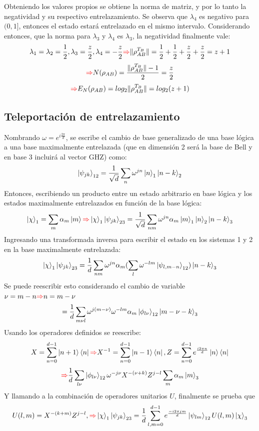 \documentclass{book}
\begin{document}
Obteniendo los valores propios se obtiene la norma de matriz, y por lo tanto la negatividad y su respectivo entrelazamiento. Se observa que $\lambda_4$ es negativo para $(0,1]$, entonces el estado estará entrelazado en el mismo intervalo. Considerando entonces, que la norma para $\lambda_3$ y $\lambda_4$ es $\lambda_3$, la negatividad finalmente vale:
$$\lambda_1=\lambda_2=\frac{1}{2},\lambda_3=\frac{z}{2},\lambda_4=-\frac{z}{2}\textcolor{red}{\Rightarrow} \lVert\rho_{AB}^{T_B}\rVert=\frac{1}{2}+\frac{1}{2}+\frac{z}{2}+\frac{z}{2}=z+1$$
$$\textcolor{red}{\Rightarrow} N(\rho_{AB})=\frac{\lVert\rho_{AB}^{T_B}\rVert-1}{2}=\frac{z}{2}$$ 
$$\textcolor{red}{\Rightarrow} E_N(\rho_{AB})=log_2\lVert\rho_{AB}^{T_B}\rVert=log_2(z+1)$$
\subsection{Teleportación de entrelazamiento} Nombrando $\omega=e^{i\frac{2\pi}{d}}$, se escribe el cambio de base generalizado de una base lógica a una base maximalmente entrelazada (que en dimensión 2 será la base de Bell y en base 3 incluirá al vector GHZ) como:
$$\ket{\psi_{jk}}_{12}=\frac{1}{\sqrt{d}}\sum_n \omega^{jn}\ket{n}_1\ket{n-k}_2$$
Entonces, escribiendo un producto entre un estado arbitrario en base lógica y los estados maximalmente entrelazados en función de la base lógica:
$$\ket{\chi}_1=\sum_m\alpha_m\ket{m}\textcolor{red}{\Rightarrow} \ket{\chi}_1\ket{\psi_{jk}}_{23}=\frac{1}{\sqrt{d}}\sum_{nm} \omega^{jn}\alpha_m\ket{m}_1\ket{n}_2\ket{n-k}_3$$
Ingresando una transformada inversa para escribir el estado en los sistemas 1 y 2 en la base maximalmente entrelazada:
$$\ket{\chi}_1\ket{\psi_{jk}}_{23}=\frac{1}{d}\sum_{nm} \omega^{jn}\alpha_m(\sum_l \omega^{-lm}\ket{\psi_{l,m-n}}_{12})\ket{n-k}_3$$
Se puede reescribir esto considerando el cambio de variable $\nu=m-n\textcolor{red}{\Rightarrow} n=m-\nu$
$$=\frac{1}{d}\sum_{m\nu l}\omega^{j(m-\nu)}\omega^{-lm}\alpha_m\ket{\phi_{l\nu}}_{12}\ket{m-\nu-k}_3 $$
Usando los operadores definidos se reescribe:
$$X=\sum_{n=0}^{d-1}\ket{n+1}\bra{n} \textcolor{red}{\Rightarrow} X^{-1}=\sum_{n=0}^{d-1}\ket{n-1}\bra{n}, Z=\sum_{n=0}^{d-1}e^{\frac{i2\pi n}{d}}\ket{n}\bra{n}$$
$$ \textcolor{red}{\Rightarrow} \frac{1}{d}\sum_{l\nu}\ket{\phi_{l\nu}}_{12}\omega^{-j\nu}X^{-(\nu+k)}Z^{j-l}\sum_m\alpha_m\ket{m}_3$$
Y llamando a la combinación de operadores unitarios $U$, finalmente se prueba que
$$ U(l,m)=X^{-(k+m)}Z^{j-l},  \textcolor{red}{\Rightarrow} \ket{\chi}_1\ket{\psi_{jk}}_{23}=\frac{1}{d}\sum_{l,m=0}^{d-1}e^{\frac{-i2\pi jm}{d}}\ket{\psi_{lm}}_{12}U(l,m)\ket{\chi}_3$$
\end{document}
